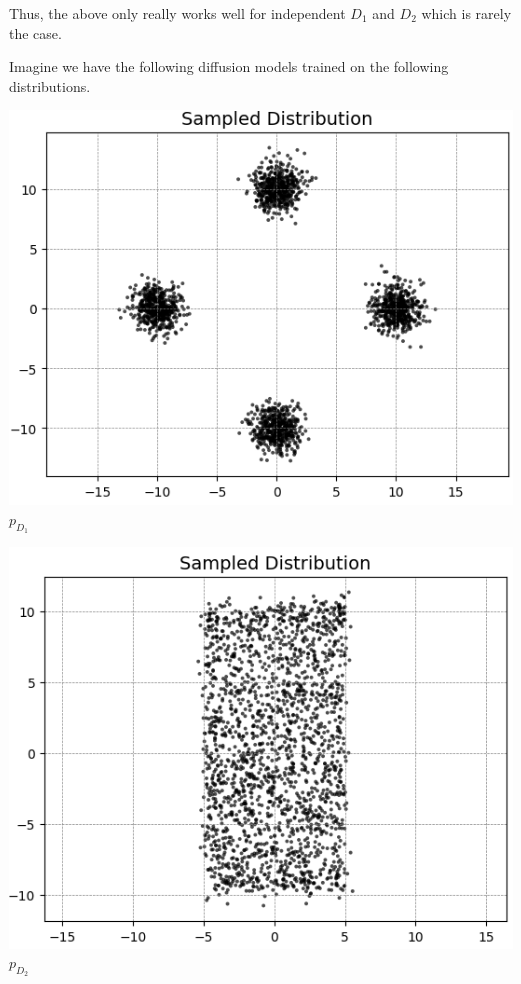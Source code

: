 \documentclass{article}
\begin{document}
Thus, the above only really works well for independent $D_1$ and $D_2$ which is rarely the case. 


\newpage 
Imagine we have the following diffusion models trained on the following distributions. 

\begin{center}
\begin{minipage}{0.4\textwidth}
  \includegraphics[width=\linewidth]{images_guidance1/GaussianMixtureForAddedScores.png}
  \centering\small $p_{D_1}$
\end{minipage}
\hfill
\begin{minipage}{0.4\textwidth}
  \includegraphics[width=\linewidth]{images_guidance1/RectangleforGaussianMixtureaddedScores.png}
  \centering\small $p_{D_2}$
\end{minipage}
\hfill
\end{center}
\end{document}

